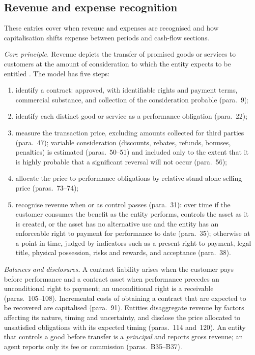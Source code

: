 \subsection{Revenue and expense recognition}

These entries cover when revenue and expenses are recognised and how capitalisation shifts expense between periods and cash-flow sections.

\begin{qfmethod}\label{meth:revenue-recognition-analysis}
 \emph{Core principle.} Revenue depicts the transfer of promised goods or services to customers at the amount of consideration to which the entity expects to be entitled \citep[IFRS~15 para.~2]{eu-2023-1803-ifrs15}. The model has five steps:
\begin{enumerate}
\item identify a contract: approved, with identifiable rights and payment terms, commercial substance, and collection of the consideration probable (para.~9);
\item identify each distinct good or service as a performance obligation (para.~22);
\item measure the transaction price, excluding amounts collected for third parties (para.~47); variable consideration (discounts, rebates, refunds, bonuses, penalties) is estimated (paras.~50--51) and included only to the extent that it is highly probable that a significant reversal will not occur (para.~56);
\item allocate the price to performance obligations by relative stand-alone selling price (paras.~73--74);
\item recognise revenue when or as control passes (para.~31): over time if the customer consumes the benefit as the entity performs, controls the asset as it is created, or the asset has no alternative use and the entity has an enforceable right to payment for performance to date (para.~35); otherwise at a point in time, judged by indicators such as a present right to payment, legal title, physical possession, risks and rewards, and acceptance (para.~38).
\end{enumerate}

\emph{Balances and disclosures.} A contract liability arises when the customer pays before performance and a contract asset when performance precedes an unconditional right to payment; an unconditional right is a receivable (paras.~105--108). Incremental costs of obtaining a contract that are expected to be recovered are capitalised (para.~91). Entities disaggregate revenue by factors affecting its nature, timing and uncertainty, and disclose the price allocated to unsatisfied obligations with its expected timing (paras.~114 and~120). An entity that controls a good before transfer is a \emph{principal} and reports gross revenue; an agent reports only its fee or commission (paras.~B35--B37).


\end{qfmethod}
